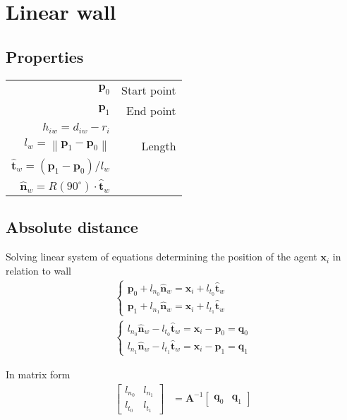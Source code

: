 \section{Linear wall}
\subsection{Properties}
\begin{table}[H]
\begin{tabularx}{1.0\linewidth}{ R R }
\hline
\hline
$ \mathbf{p}_{0} $ & Start point \\
$ \mathbf{p}_{1} $ & End point \\
\hline
\hline
$ h_{iw} = d_{iw} - r_{i} $ & \\
$ l_{w} = \left\|\mathbf{p}_{1} - \mathbf{p}_{0}\right\| $ & Length \\
$ \hat{\mathbf{t}}_{w} = \left(\mathbf{p}_{1} - \mathbf{p}_{0}\right) / l_{w} $ & \\
$ \hat{\mathbf{n}}_{w} = R(90^{\circ}) \cdot \hat{\mathbf{t}}_{w} $ & \\
\hline
\hline
\end{tabularx}
\end{table}

\subsection{Absolute distance}
Solving linear system of equations determining the position of the agent $ \mathbf{x}_{i} $ in relation to wall
\begin{align}
\begin{cases}
\mathbf{p}_{0} + l_{n_0} \hat{\mathbf{n}}_{w} = \mathbf{x}_{i} + l_{t_0} \hat{\mathbf{t}}_{w} \\
\mathbf{p}_{1} + l_{n_1} \hat{\mathbf{n}}_{w} = \mathbf{x}_{i} + l_{t_1} \hat{\mathbf{t}}_{w}
\end{cases} 
\\
\begin{cases}
l_{n_0} \hat{\mathbf{n}}_{w} - l_{t_0} \hat{\mathbf{t}}_{w} = \mathbf{x}_{i} - \mathbf{p}_{0} =  \mathbf{q}_{0} \\
l_{n_1} \hat{\mathbf{n}}_{w} - l_{t_1} \hat{\mathbf{t}}_{w} = \mathbf{x}_{i} - \mathbf{p}_{1} = \mathbf{q}_{1}
\end{cases}
\end{align}

In matrix form
\begin{align}
\begin{bmatrix} l_{n_0} & l_{n_1} \\ l_{t_0} & l_{t_1} \end{bmatrix} &= \mathbf{A}^{-1} \begin{bmatrix} \mathbf{q}_{0} & \mathbf{q}_{1} \end{bmatrix}
\end{align}

